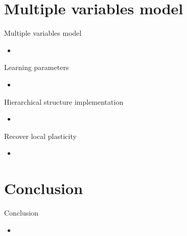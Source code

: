 \documentclass[aspectratio=43]{beamer}
\begin{document}
\section{Multiple variables model}
\begin{frame}{Multiple variables model}
  \begin{itemize}
    \item %
  \end{itemize}
\end{frame}

\begin{frame}{Learning parameters}
  \begin{itemize}
    \item %
  \end{itemize}
\end{frame}

\begin{frame}{Hierarchical structure implementation}
  \begin{itemize}
    \item %
  \end{itemize}
\end{frame}

\begin{frame}{Recover local plasticity}
  \begin{itemize}
    \item %
  \end{itemize}
\end{frame}




\section{Conclusion}
\begin{frame}{Conclusion}
  \begin{itemize}
    \item %
  \end{itemize}
\end{frame}
\end{document}
